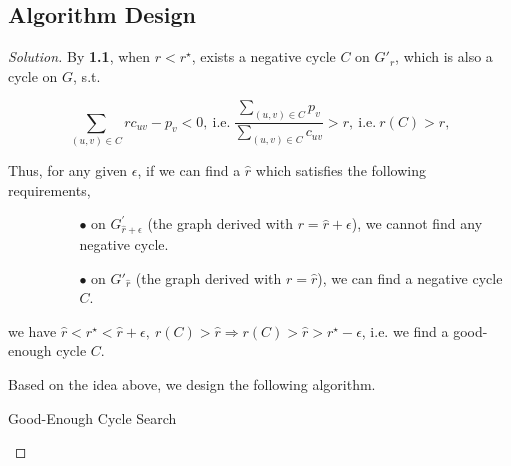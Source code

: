 \documentclass{article}
\newenvironment{solution}{\begin{proof}[\noindent\it Solution]}{\end{proof}}
\begin{document}
\newpage

\subsection{Algorithm Design}
\vspace{1em}
\begin{solution}
    By \textbf{1.1}, when $r<r^{\star}$, exists a negative cycle $C$ on $G'_{r}$, which is also a cycle on $G$, s.t.
    
    \vspace{-1.3em}
    $$\sum_{(u,v)\in C}rc_{uv}-p_v<0,\ \mathrm{i.e.}\ \frac{\sum_{(u,v)\in C}p_v}{\sum_{(u,v)\in C}c_{uv}}>r,\ \mathrm{i.e.}\ r(C)>r,$$
    
    \hspace{2.6em}
    Thus, for any given $\epsilon$, if we can find a $\hat{r}$ which satisfies the following requirements,
    
    \vspace{-0.75em}
    \begin{itemize}
        \item[] \begin{itemize}
            \item[] \begin{itemize}
                \item[$\bullet$] on $G_{\hat{r}+\epsilon}^{\prime}$ (the graph derived with $r=\hat{r}+\epsilon$), we cannot find any negative cycle.
                \item[$\bullet$] on $G'_{\hat{r}}$ (the graph derived with $r=\hat{r}$), we can find a negative cycle $C$.
            \end{itemize}
        \end{itemize} 
    \end{itemize}
    
    \vspace{-0.75em} \hspace{2.6em}
    we have $\hat{r}<r^{\star}<\hat{r}+\epsilon,\ r(C)>\hat{r} \Longrightarrow r(C)>\hat{r}>r^{\star}-\epsilon$, i.e. we find a good-enough cycle $C$.
    
    \vspace{1em} \hspace{2.6em}
    Based on the idea above, we design the following algorithm.
    
    \begin{algorithm}
        \caption{Good-Enough Cycle Search}
        

\end{algorithm}
\end{solution}
\end{document}
